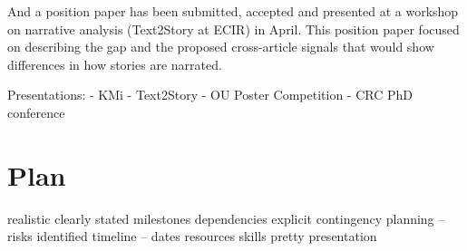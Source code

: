 And a position paper has been submitted, accepted and presented at a workshop on narrative analysis (Text2Story at ECIR) in April.
This position paper focused on describing the gap and the proposed cross-article signals that would show differences in how stories are narrated.

Presentations:
- KMi
- Text2Story
- OU Poster Competition
- CRC PhD conference






\section{Plan}

realistic
clearly stated milestones
dependencies explicit
contingency planning – risks identified
timeline – dates
resources
skills
pretty presentation

